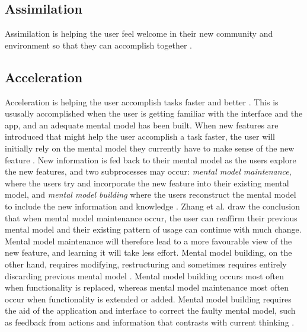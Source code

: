 \subsection{Assimilation}
Assimilation is helping the user feel welcome in their new community and environment so that they can accomplish together \cite{Bradt2009}.

\subsection{Acceleration}
Acceleration is helping the user accomplish tasks faster and better \cite{Bradt2009}. This is ususally accomplished when the user is getting familiar with the interface and the app, and an adequate mental model has been built. When new features are introduced that might help the user accomplish a task faster, the user will initially rely on the mental model they currently have to make sense of the new feature \cite{Orlikowski2000}. New information is fed back to their mental model as the users explore the new features, and two subprocesses may occur: \textit{mental model maintenance}, where the users try and incorporate the new feature into their existing mental model, and \textit{mental model building} where the users reconstruct the mental model to include the new information and knowledge \cite{Vandenbosch1996}. Zhang et al. \cite{Zhang2011} draw the conclusion that when mental model maintenance occur, the user can reaffirm their previous mental model and their existing pattern of usage can continue with much change. Mental model maintenance will therefore lead to a more favourable view of the new feature, and learning it will take less effort. Mental model building, on the other hand, requires modifying, restructuring and sometimes requires entirely discarding previous mental model \cite{Vandenbosch1996}. Mental model building occurs most often when functionality is replaced, whereas mental model maintenance most often occur when functionality is extended or added. Mental model building requires the aid of the application and interface to correct the faulty mental model, such as feedback from actions and information that contrasts with current thinking \cite{Hsu2011}.

